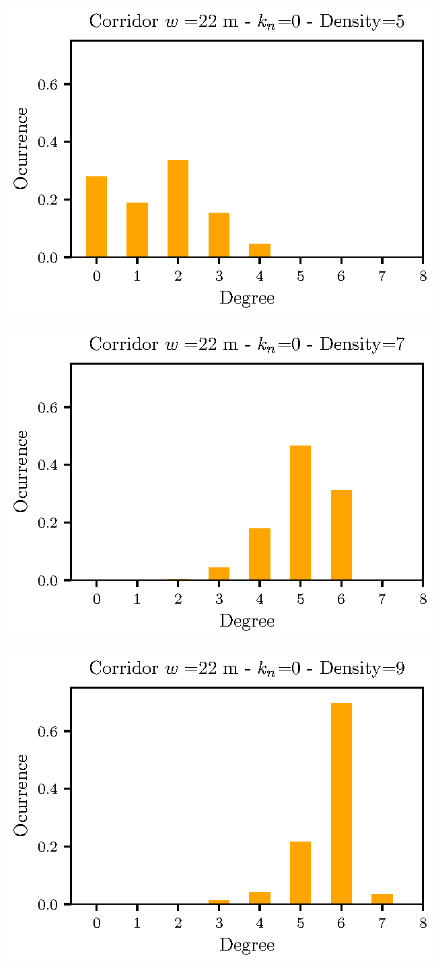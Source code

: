 \documentclass[preprint,12pt]{elsarticle}
\begin{document}
\begin{figure}[htbp!]
\centering
\includegraphics[width=0.7\columnwidth]
{./histo_grado_density5_width22_kn0.eps}
\caption{\label{} }
\end{figure}


\begin{figure}[htbp!]
\centering
\includegraphics[width=0.7\columnwidth]
{./histo_grado_density7_width22_kn0.eps}
\caption{\label{} }
\end{figure}

\begin{figure}[htbp!]
\centering
\includegraphics[width=0.7\columnwidth]
{./histo_grado_density9_width22_kn0.eps}
\caption{\label{} }
\end{figure}
\end{document}
